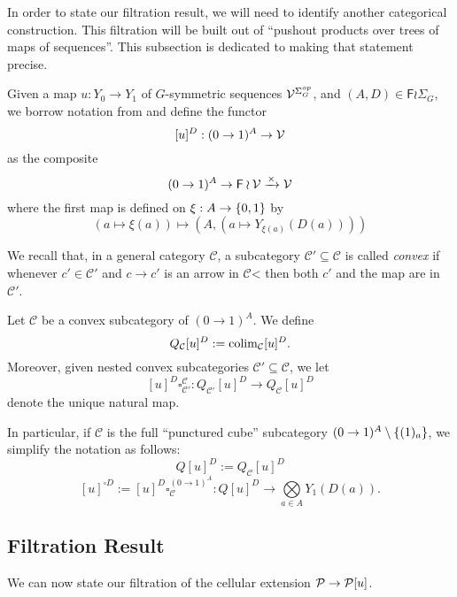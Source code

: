\documentclass[a4paper,10pt]{article}%
\begin{document}
In order to state our filtration result, we will need to identify another categorical construction. This filtration will be built out of ``pushout products over trees of maps of sequences''. This subsection is dedicated to making that statement precise.

\begin{definition}
  Given a map $u: Y_0 \to Y_1$ of $G$-symmetric sequences $\V^{\Sigma_G^{op}}$, and $(A,D) \in \mathsf F \wr \Sigma_G$, we borrow notation from \cite{BM03} and define the functor
\[
[u]^D: (0 \to 1)^A \to \V
\]
as the composite
\[
(0 \to 1)^A \to \mathsf F \wr \V \xrightarrow{\times} \V
\]
where the first map is defined on $\xi: A \to \set{0,1}$ by
\[
(a \mapsto \xi(a)) \mapsto (A, (a \mapsto Y_{\xi(a)}(D(a))))
\]
\end{definition}

We recall that, in a general category $\mathcal C$, a subcategory $\mathcal C' \subseteq \mathcal C$ is called \textit{convex} if whenever $c' \in \mathcal C'$ and $c \to c'$ is an arrow in $\mathcal C$< then both $c'$ and the map are in $\mathcal C'$. 

\begin{definition}
  \label{Q_DEFINITION}
  Let $\mathcal C$ be a convex subcategory of $(0 \to 1)^A$. We define 
\[
Q_{\mathcal C}[u]^D := \colim_{\mathcal C}[u]^D.
\]
Moreover, given nested convex subcategories $\mathcal C' \subseteq \mathcal C$, we let
\[
[u]^D\square_{\mathcal C'}^{\mathcal C}: Q_{\mathcal C'}[u]^D \to Q_{\mathcal C}[u]^D
\]
denote the unique natural map.

In particular, if $\mathcal C$ is the full ``punctured cube'' subcategory $(0 \to 1)^A \setminus \set{(1)_a}$, we simplify the notation as follows:
\[
Q[u]^D := Q_{\mathcal C}[u]^D
\]
\[
[u]^{\square D} := [u]^D\square_{\mathcal C}^{(0 \to 1)^A}: Q[u]^D \to \bigotimes\limits_{a \in A}Y_1(D(a)).
\]
\end{definition}

\subsection{Filtration Result}

We can now state our filtration of the cellular extension $\P \to \P[u]$. 
\end{document}

